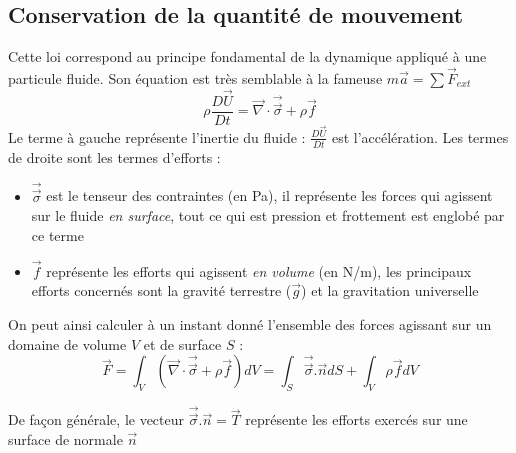 \subsection{Conservation de la quantité de mouvement}
Cette loi correspond au principe fondamental de la dynamique appliqué à une particule fluide. Son équation est très semblable à la fameuse $m\vec{a}=\sum \vec{F}_{ext}$
%
\begin{equation}
    \rho \frac{D\vec{U}}{Dt} = \vec{\nabla} \cdot \vec{\vec{\sigma}} + \rho \vec{f}
    \label{eq:QDM}
\end{equation}
%
Le terme à gauche représente l'inertie du fluide : $\frac{D\vec{U}}{Dt}$ est l'accélération. Les termes de droite sont les termes d'efforts :

\begin{itemize}
    \item $\vec{\vec{\sigma}}$ est le tenseur des contraintes (en Pa), il représente les forces qui agissent sur le fluide \textit{en surface}, tout ce qui est pression et frottement est englobé par ce terme
    \item $\vec{f}$ représente les efforts qui agissent \textit{en volume} (en N/m), les principaux efforts concernés sont la gravité terrestre ($\vec{g}$) et la gravitation universelle
\end{itemize}

On peut ainsi calculer à un instant donné l'ensemble des forces agissant sur un domaine de volume $V$ et de surface $S$ :
%
\begin{equation}
    \vec{F} = \int_V { \left( \vec{\nabla} \cdot \vec{\vec{\sigma}} + \rho \vec{f} \right) dV }
            = \int_S { \vec{\vec{\sigma}}.\vec{n} dS} + \int_V {\rho \vec{f} dV }
\end{equation}

De façon générale, le vecteur $\vec{\vec{\sigma}}.\vec{n} = \vec{T}$ représente les efforts exercés sur une surface de normale $\vec{n}$



